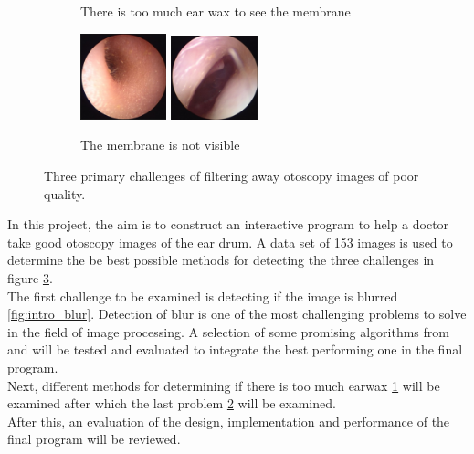 \begin{figure}[H]
\begin{subfigure}[t]{0.32\textwidth}
        \caption{There is too much ear wax to see the membrane}
        \label{fig:intro_wax}
    \end{subfigure}
    \begin{subfigure}[t]{0.32\textwidth}
        \centering
        \includegraphics[width=2.5cm]{Figures/Intro/ear1.png}
        \includegraphics[width=2.5cm]{Figures/Intro/ear2.png}
        \caption{The membrane is not visible}
        \label{fig:intro_not_visible}
    \end{subfigure}
    \caption{Three primary challenges of filtering away otoscopy images of poor quality.}
    \label{fig:intro}
\end{figure}

In this project, the aim is to construct an interactive program to help a doctor take good otoscopy images of the ear drum. A data set of 153 images is used to determine the be best possible methods for detecting the three challenges in figure \ref{fig:intro}.\\
The first challenge to be examined is detecting if the image is blurred \ref{fig:intro_blur}. Detection of blur is one of the most challenging problems to solve in the field of image processing\cite{FM}. A selection of some promising algorithms from \cite{FM} and \cite{JNB} will be tested and evaluated to integrate the best performing one in the final program.\\
Next, different methods for determining if there is too much earwax \ref{fig:intro_wax} will be examined after which the last problem \ref{fig:intro_not_visible} will be examined.\\
After this, an evaluation of the design, implementation and performance of the final program will be reviewed.
